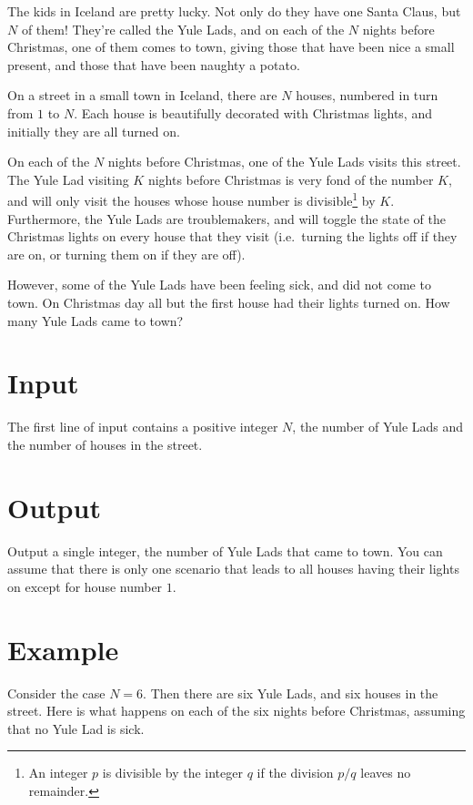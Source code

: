 \def\version{1}

The kids in Iceland are pretty lucky. Not only do they have one Santa Claus,
but $N$ of them! They're called the Yule Lads, and on each of the $N$ nights
before Christmas, one of them comes to town, giving those that have been nice a
small present, and those that have been naughty a potato.

On a street in a small town in Iceland, there are $N$ houses, numbered
in turn from $1$ to $N$. Each house is beautifully decorated with
Christmas lights, and initially they are all turned on.

On each of the $N$ nights before Christmas, one of the Yule Lads visits this
street. The Yule Lad visiting $K$ nights before Christmas is very fond of the
number $K$, and will only visit the houses whose house number is
divisible\footnote{An integer $p$ is divisible by the integer $q$ if the
division $p/q$ leaves no remainder.} by $K$. Furthermore, the Yule Lads are
troublemakers, and will toggle the state of the Christmas lights on every house
that they visit (i.e.\ turning the lights off if they are on, or turning them
on if they are off).

However, some of the Yule Lads have been feeling sick, and did not come to
town. On Christmas day all but the first house had their lights turned on. How
many Yule Lads came to town?

\section*{Input}
The first line of input contains a positive integer $N$, the number of Yule
Lads and the number of houses in the street.

\section*{Output}
Output a single integer, the number of Yule Lads that came to town. You can
assume that there is only one scenario that leads to all houses having their
lights on except for house number $1$.



\section*{Example}
Consider the case $N = 6$. Then there are six Yule Lads, and six houses in the
street. Here is what happens on each of the six nights before Christmas,
assuming that no Yule Lad is sick.

